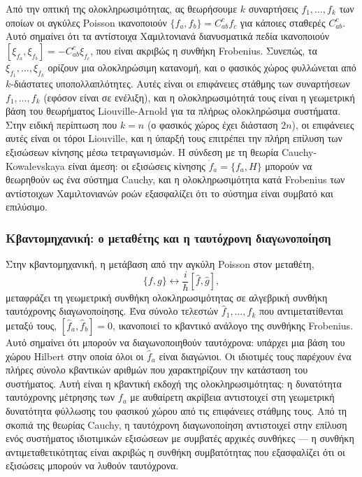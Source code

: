 \documentclass[12pt]{article}
\begin{document}
Από την οπτική της ολοκληρωσιμότητας, ας θεωρήσουμε $k$ συναρτήσεις $f_1, \dots, f_k$ των οποίων οι αγκύλες Poisson ικανοποιούν $\{f_a, f_b\} = C_{ab}^c f_c$ για κάποιες σταθερές $C_{ab}^c$. Αυτό σημαίνει ότι τα αντίστοιχα Χαμιλτονιανά διανυσματικά πεδία ικανοποιούν $[\xi_{f_a}, \xi_{f_b}] = -C_{ab}^c \xi_{f_c}$, που είναι ακριβώς η συνθήκη Frobenius. Συνεπώς, τα $\xi_{f_1}, \dots, \xi_{f_k}$ ορίζουν μια ολοκληρώσιμη κατανομή, και ο φασικός χώρος φυλλώνεται από $k$-διάστατες υποπολλαπλότητες. Αυτές είναι οι επιφάνειες στάθμης των συναρτήσεων $f_1, \dots, f_k$ (εφόσον είναι σε ενέλιξη), και η ολοκληρωσιμότητά τους είναι η γεωμετρική βάση του θεωρήματος Liouville-Arnold για τα πλήρως ολοκληρώσιμα συστήματα. Στην ειδική περίπτωση που $k = n$ (ο φασικός χώρος έχει διάσταση $2n$), οι επιφάνειες αυτές είναι οι τόροι Liouville, και η ύπαρξή τους επιτρέπει την πλήρη επίλυση των εξισώσεων κίνησης μέσω τετραγωνισμών. Η σύνδεση με τη θεωρία Cauchy-Kowalevskaya είναι άμεση: οι εξισώσεις κίνησης $\dot{f}_a = \{f_a, H\}$ μπορούν να θεωρηθούν ως ένα σύστημα Cauchy, και η ολοκληρωσιμότητα κατά Frobenius των αντίστοιχων Χαμιλτονιανών ροών εξασφαλίζει ότι το σύστημα είναι συμβατό και επιλύσιμο.

\subsubsection{Κβαντομηχανική: ο μεταθέτης και η ταυτόχρονη διαγωνοποίηση}

Στην κβαντομηχανική, η μετάβαση από την αγκύλη Poisson στον μεταθέτη,
\begin{equation}
\{f, g\} \longleftrightarrow \frac{i}{\hbar} [\hat{f}, \hat{g}],
\end{equation}
μεταφράζει τη γεωμετρική συνθήκη ολοκληρωσιμότητας σε αλγεβρική συνθήκη ταυτόχρονης διαγωνοποίησης. Ένα σύνολο τελεστών $\hat{f}_1, \dots, \hat{f}_k$ που αντιμετατίθενται μεταξύ τους, $[\hat{f}_a, \hat{f}_b] = 0$, ικανοποιεί το κβαντικό ανάλογο της συνθήκης Frobenius. Αυτό σημαίνει ότι μπορούν να διαγωνοποιηθούν ταυτόχρονα: υπάρχει μια βάση του χώρου Hilbert στην οποία όλοι οι $\hat{f}_a$ είναι διαγώνιοι. Οι ιδιοτιμές τους παρέχουν ένα πλήρες σύνολο κβαντικών αριθμών που χαρακτηρίζουν την κατάσταση του συστήματος. Αυτή είναι η κβαντική εκδοχή της ολοκληρωσιμότητας: η δυνατότητα ταυτόχρονης μέτρησης των $f_a$ με αυθαίρετη ακρίβεια αντιστοιχεί στη γεωμετρική δυνατότητα φύλλωσης του φασικού χώρου από τις επιφάνειες στάθμης τους. Από τη σκοπιά της θεωρίας Cauchy, η ταυτόχρονη διαγωνοποίηση αντιστοιχεί στην επίλυση ενός συστήματος ιδιοτιμικών εξισώσεων με συμβατές αρχικές συνθήκες — η συνθήκη αντιμεταθετικότητας είναι ακριβώς η συνθήκη συμβατότητας που εξασφαλίζει ότι οι εξισώσεις μπορούν να λυθούν ταυτόχρονα.
\end{document}
